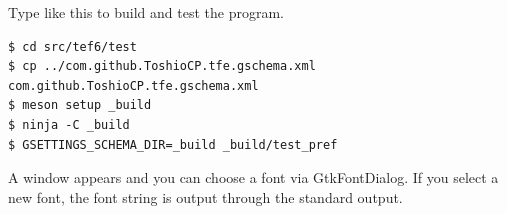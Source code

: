 Type like this to build and test the program.

\begin{lstlisting}
$ cd src/tef6/test
$ cp ../com.github.ToshioCP.tfe.gschema.xml com.github.ToshioCP.tfe.gschema.xml
$ meson setup _build
$ ninja -C _build
$ GSETTINGS_SCHEMA_DIR=_build _build/test_pref
\end{lstlisting}

A window appears and you can choose a font via GtkFontDialog. If you
select a new font, the font string is output through the standard
output.
